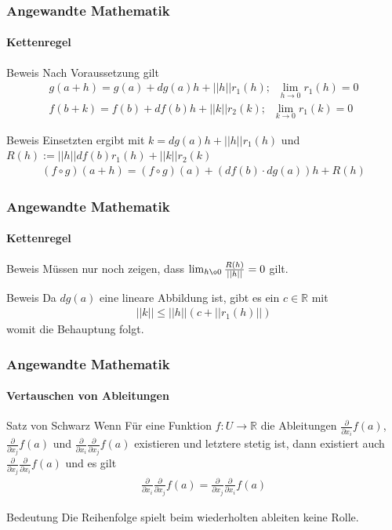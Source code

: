 \documentclass{beamer}
\begin{document}
\begin{frame}
    \frametitle{Angewandte Mathematik}
\framesubtitle{Kettenregel}
    \begin{block}{Beweis}
Nach Voraussetzung gilt
\begin{align*}
g(a + h) = g(a) + dg(a)h + ||h||r_1(h);  \; \; \lim_{h \to 0} r_1(h) = 0\\
f(b + k) = f(b) + df(b)h + ||k||r_2(k); \; \; \lim_{k \to 0} r_1(k) = 0
\end{align*}
\end{block}

    \begin{block}{Beweis}
Einsetzten ergibt mit $k= dg(a)h + ||h||r_1(h)$ und $R(h):= ||h|| df(b) r_1(h) + ||k|| r_2(k)$  
\begin{align*}
(f \circ g)(a + h) = (f \circ g)(a)  + (df(b) \cdot dg(a) )h + R(h)
\end{align*}
\end{block}

 \end{frame}



\begin{frame}
    \frametitle{Angewandte Mathematik}
\framesubtitle{Kettenregel}
    \begin{block}{Beweis}
Müssen nur noch zeigen, dass $\lim_{h \o 0} \frac{R(h)}{||h||} = 0$ gilt.

\end{block}

    \begin{block}{Beweis}
Da $dg(a)$ eine lineare Abbildung ist, gibt es ein $c \in \mathbb{R}$ mit 
\begin{align*}
||k|| \leq ||h|| (c + || r_1(h)||)
\end{align*}
womit die Behauptung folgt.
\end{block}



 \end{frame}





\begin{frame}
    \frametitle{Angewandte Mathematik}
\framesubtitle{Vertauschen von Ableitungen}
    \begin{block}{Satz von Schwarz}
Wenn Für eine Funktion $f: U \to \mathbb{R}$ die Ableitungen $\frac{\partial}{\partial x_i} f(a)$, $\frac{\partial}{\partial x_j}f(a)$ und $ \frac{\partial}{\partial x_i}\frac{\partial }{\partial x_j} f(a)$ existieren und letztere stetig ist, dann existiert auch $ \frac{\partial}{\partial x_j}\frac{\partial }{\partial x_i} f(a)$ und es gilt
\begin{align*}
\frac{\partial}{\partial x_i}\frac{\partial }{\partial x_j} f(a) = \frac{\partial}{\partial x_j}\frac{\partial }{\partial x_i} f(a)
\end{align*}
\end{block}
    \begin{block}{Bedeutung}
Die Reihenfolge spielt beim wiederholten ableiten keine Rolle.
\end{block}
 \end{frame}
\end{document}
